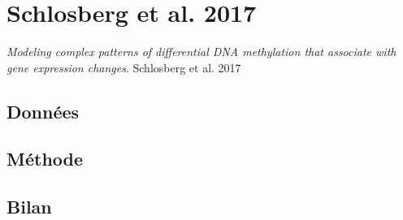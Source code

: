 \documentclass{beamer}
\begin{document}
\section{Schlosberg et al. 2017}

\begin{frame}
\begin{center}
\textit{Modeling complex patterns of differential DNA methylation that associate with gene expression changes}. Schlosberg et al. 2017
\end{center}
\end{frame}





\subsection{Données}

\subsection{Méthode}

\subsection{Bilan}
\end{document}
